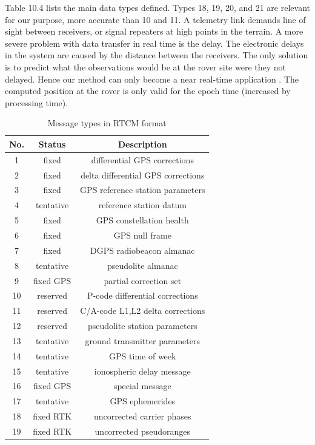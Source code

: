 Table 10.4 lists the main data types defined. Types 18, 19, 20, and 21 are relevant for our purpose, more accurate than 10 and 11. A telemetry link demands line of sight between receivers, or signal repeaters at high points in the terrain. A more severe problem with data transfer in real time is the delay. The electronic delays in the system are caused by the distance between the receivers. The only solution is to predict what the observations would be at the rover site were they not delayed. Hence our method can only become a near real-time application . The computed position at the rover is only valid for the epoch time (increased by processing time).

\begin{table}[htbp]
	\caption{Message types in RTCM format}
	\newcommand{\tabincell}[2]{\begin{tabular}{@{}#1@{}}#2\end{tabular}}
	\begin{tabular}{ccc}
		\hline
		No.&Status&Description\\
		\hline
		1& fixed &differential GPS corrections\\
		2& fixed &delta differential GPS corrections\\
		3& fixed &GPS reference station parameters\\
		4& tentative &reference station datum\\
		5& fixed &GPS constellation health\\
		6& fixed &GPS null frame\\
		7& fixed &DGPS radiobeacon almanac\\
		8& tentative &pseudolite almanac\\
		9& fixed GPS &partial correction set\\
		10& reserved &P-code differential corrections\\
		11& reserved &C/A-code L1,L2 delta corrections\\
		12& reserved &pseudolite station parameters\\
		13& tentative &ground transmitter parameters\\
		14& tentative &GPS time of week\\
		15& tentative& ionospheric delay message\\
		16& fixed GPS &special message\\
		17& tentative& GPS ephemerides\\
		18& fixed RTK& uncorrected carrier phases\\
		19& fixed RTK &uncorrected pseudoranges\\

\end{tabular}
\end{table}
